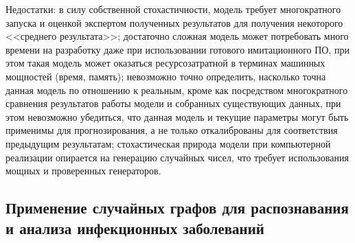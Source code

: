 Недостатки: в силу собственной стохастичности, модель требует многократного запуска  и оценкой экспертом полученных результатов для получения некоторого <<среднего результата>>; достаточно сложная модель может потребовать много времени на разработку даже при использовании готового имитационного ПО, при этом такая модель может оказаться ресурсозатратной в терминах машинных мощностей (время, память); невозможно точно определить, насколько точна данная модель по отношению к реальным, кроме как посредством многократного сравнения результатов работы модели и собранных существующих данных, при этом невозможно убедиться, что данная модель и текущие параметры могут быть применимы для прогнозирования, а не только откалиброваны для соответствия предыдущим результатам; стохастическая природа модели при компьютерной реализации опирается на генерацию случайных чисел, что требует использования мощных и проверенных генераторов. 

\subsection{Применение случайных графов для распознавания и анализа инфекционных заболеваний}

